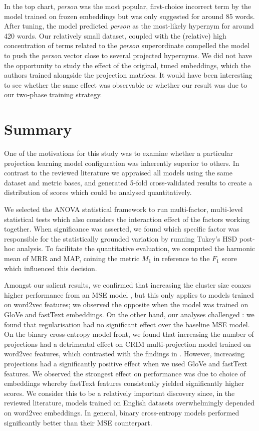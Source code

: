 In the top chart, \textit{person} was the most popular, first-choice incorrect term by the model trained on frozen embeddings but was only suggested for around 85 words.  After tuning, the model predicted \textit{person} as the most-likely hypernym for around 420 words.  Our relatively small dataset, coupled with the (relative) high concentration of terms related to the \textit{person} superordinate compelled the model to push the \textit{person} vector close to several projected hypernyms.  We did not have the opportunity to study the effect of the original, tuned embeddings, which the authors trained alongside the projection matrices.  It would have been interesting to see whether the same effect was observable or whether our result was due to our two-phase training strategy.

\section{Summary}
One of the motivations for this study was to examine whether a particular projection learning model configuration was inherently superior to others.  In contrast to the reviewed literature we appraised all models using the same dataset and metric bases, and generated 5-fold cross-validated results to create a distribution of scores which could be analysed quantitatively.

We selected the ANOVA statistical framework to run multi-factor, multi-level statistical tests which also considers the interaction effect of the factors working together.  When significance was asserted, we found which specific factor was responsible for the statistically grounded variation by running Tukey's HSD post-hoc analysis.  To facilitate the quantitative evaluation, we computed the harmonic mean of MRR and MAP, coining the metric $M_1$ in reference to the $F_1$ score which influenced this decision.

Amongst our salient results, we confirmed that increasing the cluster size coaxes higher performance from an MSE model \citep{Fu2014}, but this only applies to models trained on word2vec features; we observed the opposite when the model was trained on GloVe and fastText embeddings.  On the other hand, our analyses challenged \citep{ustalov2017negative}: we found that regularisation had no significant effect over the baseline MSE model.  On the binary cross-entropy model front, we found that increasing the number of projections had a detrimental effect on CRIM multi-projection model trained on word2vec features, which contrasted with the findings in \citep{bernier2018crim}.  However, increasing projections had a significantly positive effect when we used GloVe and fastText features.  We observed the strongest effect on performance was due to choice of embeddings whereby fastText features consistently yielded significantly higher scores.  We consider this to be a relatively important discovery since, in the reviewed literature, models trained on English datasets overwhelmingly depended on word2vec embeddings.  In general, binary cross-entropy models performed significantly better than their MSE counterpart.

